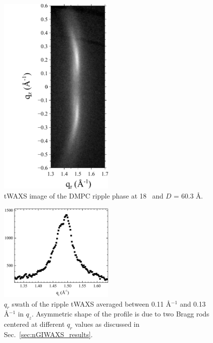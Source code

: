 \begin{figure}[htbp]
  \centering
  \includegraphics[trim=20 0 10 0,clip,width=0.5\textwidth]{figures/ripple/tWAXS/twaxs_ripple}
  \caption[tWAXS image of the DMPC ripple phase]{tWAXS image of the DMPC
  ripple phase at 18 \textcelsius\ and $D$ = 60.3 \AA.}
  \label{fig:twaxs_ripple}
\end{figure}

\begin{figure}[htbp]
  \centering
  \includegraphics[width=0.5\textwidth]{figures/ripple/tWAXS/twaxs_weak_qr}
  \caption{$q_r$ swath of the ripple tWAXS averaged between 0.11 \AA$^{-1}$
  and 0.13 \AA$^{-1}$ in $q_z$. Asymmetric shape of the profile is due to
  two Bragg rods centered at different $q_r$ values as discussed in
  Sec.~\ref{sec:nGIWAXS_results}.}
  \label{fig:twaxs_weak_qr}
\end{figure}

